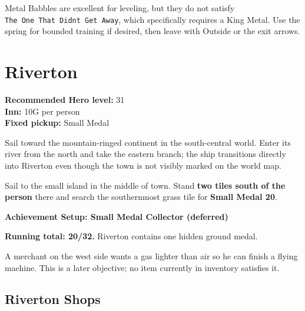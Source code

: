 \documentclass[
  american,
  10pt,
  letterpaper,
  oneside,
  open=any]{scrreprt}
\begin{document}
Metal Babbles are excellent for leveling, but they do not satisfy
\texttt{The\ One\ That\ Didn\textquotesingle{}t\ Get\ Away}, which
specifically requires a King Metal. Use the spring for bounded training
if desired, then leave with Outside or the exit arrows.

\section{Riverton}\label{riverton}

\textbf{Recommended Hero level:} 31\\
\textbf{Inn:} 10G per person\\
\textbf{Fixed pickup:} Small Medal

Sail toward the mountain-ringed continent in the south-central world.
Enter its river from the north and take the eastern branch; the ship
transitions directly into Riverton even though the town is not visibly
marked on the world map.

Sail to the small island in the middle of town. Stand \textbf{two tiles
south of the person} there and search the southernmost grass tile for
\textbf{Small Medal 20}.

\begin{achievementsetup}

\textbf{Achievement Setup: Small Medal Collector (deferred)}

\textbf{Running total: 20/32.} Riverton contains one hidden ground
medal.

\end{achievementsetup}

A merchant on the west side wants a gas lighter than air so he can
finish a flying machine. This is a later objective; no item currently in
inventory satisfies it.

\subsection{Riverton Shops}\label{riverton-shops}
\end{document}
